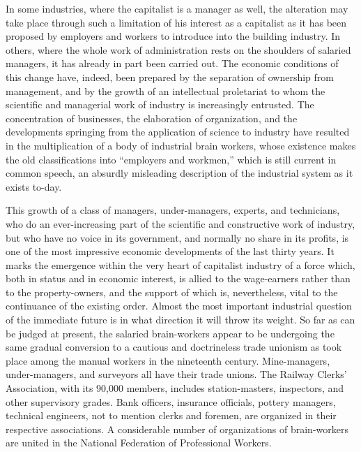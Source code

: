 \documentclass{book}
\begin{document}
In some industries, where the capitalist is a manager as well, the alteration may take place through such a limitation of his interest as a capitalist as it has been proposed by employers and workers to introduce into the building industry. In others, where the whole work of administration rests on the shoulders of salaried managers, it has already in part been carried out. The economic conditions of this change have, indeed, been prepared by the separation of ownership from management, and by the growth of an intellectual proletariat to whom the scientific and managerial work of industry is increasingly entrusted. The concentration of businesses, the elaboration of organization, and the developments springing from the application of science to industry have resulted in the multiplication of a body of industrial brain workers, whose existence makes the old classifications into “employers and workmen,” which is still current in common speech, an absurdly misleading description of the industrial system as it exists to-day.

This growth of a class of managers, under-managers, experts, and technicians, who do an ever-increasing part of the scientific and constructive work of industry, but who have no voice in its government, and normally no share in its profits, is one of the most impressive economic developments of the last thirty years. It marks the emergence within the very heart of capitalist industry of a force which, both in status and in economic interest, is allied to the wage-earners rather than to the property-owners, and the support of which is, nevertheless, vital to the continuance of the existing order. Almost the most important industrial question of the immediate future is in what direction it will throw its weight. So far as can be judged at present, the salaried brain-workers appear to be undergoing the same gradual conversion to a cautious and doctrineless trade unionism as took place among the manual workers in the nineteenth century. Mine-managers, under-managers, and surveyors all have their trade unions. The Railway Clerks’ Association, with its 90,000 members, includes station-masters, inspectors, and other supervisory grades. Bank officers, insurance officials, pottery managers, technical engineers, not to mention clerks and foremen, are organized in their respective associations. A considerable number of organizations of brain-workers are united in the National Federation of Professional Workers.
\end{document}
